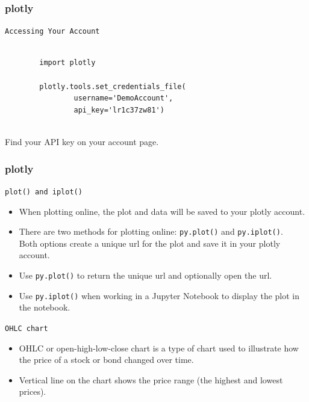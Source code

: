 \documentclass{beamer}
\begin{document}
\begin{frame}[fragile]
\frametitle{plotly}
	\Large
	\texttt{Accessing Your Account}
	\begin{framed}
		\begin{verbatim}
		
		import plotly 
		
		plotly.tools.set_credentials_file(
				username='DemoAccount', 
				api_key='lr1c37zw81')
		
		\end{verbatim}
	\end{framed}
	Find your API key on your account page.
\end{frame}
\begin{frame}
	\frametitle{plotly}
\Large
\texttt{\texttt{plot()} and \texttt{iplot() }}
\medskip
\begin{itemize}
	\item When plotting online, the plot and data will be saved to your plotly account.  \smallskip
	\item There are two methods for plotting online: \texttt{py.plot()} and \texttt{py.iplot()}. \\ Both options create a unique url for the plot and save it in your plotly account. \smallskip
	\item Use \texttt{py.plot()} to return the unique url and optionally open the url. \smallskip
	\item Use \texttt{py.iplot()} when working in a Jupyter Notebook to display the plot in the notebook.
\end{itemize}
\end{frame}
\begin{frame}
	\large
	\texttt{OHLC chart}
\begin{itemize}
	\item 	OHLC or open-high-low-close chart is a type of chart used to illustrate how the price of a stock or bond changed over time. 
	
	\item Vertical line on the chart shows the price range (the highest and lowest prices).
\end{itemize}	

\end{frame}

\end{document}
